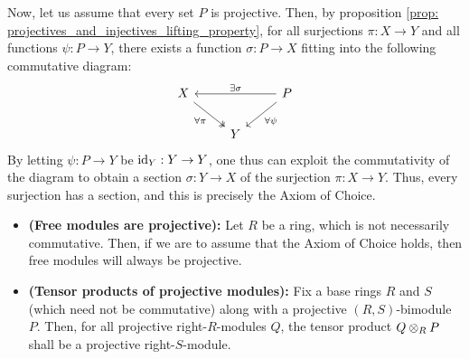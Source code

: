 \begin{remark}
                    Now, let us assume that every set $P$ is projective. Then, by proposition \ref{prop: projectives_and_injectives_lifting_property}, for all surjections $\pi: X \to Y$ and all functions $\psi: P \to Y$, there exists a function $\sigma: P \to X$ fitting into the following commutative diagram:
                        $$
                            \begin{tikzcd}
                            	X && P \\
                            	& Y
                            	\arrow["\forall \pi"', two heads, from=1-1, to=2-2]
                            	\arrow["\forall \psi", from=1-3, to=2-2]
                            	\arrow["{\exists \sigma}"', from=1-3, to=1-1]
                            \end{tikzcd}
                        $$
                    By letting $\psi: P \to Y$ be $\mathrm{id}_Y: Y \to Y$, one thus can exploit the commutativity of the diagram to obtain a section $\sigma: Y \to X$ of the surjection $\pi: X \to Y$. Thus, every surjection has a section, and this is precisely the Axiom of Choice. 
                \end{remark}
                \begin{corollary} \label{coro: tensor_products_freeness_and_projectiveness}
                    \noindent
                    \begin{itemize}
                        \item \textbf{(Free modules are projective):} Let $R$ be a ring, which is not necessarily commutative. Then, if we are to assume that the Axiom of Choice holds, then free modules will always be projective.
                        \item \textbf{(Tensor products of projective modules):} Fix a base rings $R$ and $S$ (which need not be commutative) along with a projective $(R, S)$-bimodule $P$. Then, for all projective right-$R$-modules $Q$, the tensor product $Q \tensor_R P$ shall be a projective right-$S$-module.
                    \end{itemize}
                \end{corollary}
